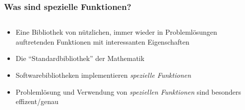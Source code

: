 %
%
%
\bgroup
\begin{frame}[t]
\setlength{\abovedisplayskip}{5pt}
\setlength{\belowdisplayskip}{5pt}
\frametitle{Was sind spezielle Funktionen?}
\vspace{-20pt}
\begin{columns}[t,onlytextwidth]
\begin{column}{0.48\textwidth}
\begin{itemize}
\item
Eine Bibliothek von nützlichen, immer wieder in Problemlösungen
auftretenden Funktionen mit interessanten Eigenschaften
\item<2->
Die ``Standardbibliothek'' der Mathematik
\item<3->
Softwarebibliotheken implementieren {\em spezielle Funktionen}
\item<4->
Problemlösung und Verwendung von {\em speziellen Funktionen}
sind
besonders effizent/genau
\end{itemize}
\end{column}
\begin{column}{0.48\textwidth}
\end{column}
\end{columns}
\end{frame}
\egroup
